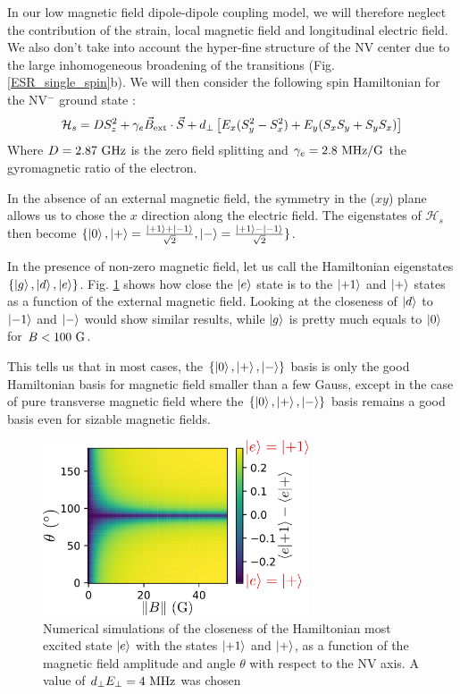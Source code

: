 \documentclass[preprintnumbers,amsmath,amssymb,onecolumn,12pt]{revtex4-2}
\begin{document}
In our low magnetic field dipole-dipole coupling model, we will therefore neglect the contribution of the strain, local magnetic field and longitudinal electric field.  We also don't take into account the hyper-fine structure of the NV center due to the large inhomogeneous broadening of the transitions (Fig. \ref{ESR_single_spin}b).
We will then consider the following spin Hamiltonian for the NV$^-$ ground state : 
\begin{equation}
\label{NV Hamiltonian}
\mathcal{H}_s=D S_z^2 + \gamma_e \vec{B}_{\rm ext} \cdot \vec{S}+ d_\perp \left[ E_x(S_y^2-S_x^2) + E_y(S_xS_y+S_yS_x) \right]
\end{equation}
Where $D=2.87\ \rm GHz$ is the zero field splitting and $\gamma_e=2.8\ \rm MHz/G$ the gyromagnetic ratio of the electron.

In the absence of an external magnetic field, the symmetry in the ($xy$) plane allows us to chose the $x$ direction along the electric field. The eigenstates of $\mathcal{H}_s$ then become $\{ \ket{0},\ket{+}=\frac{\ket{+1}+\ket{-1}}{\sqrt{2}},\ket{-}=\frac{\ket{+1}-\ket{-1}}{\sqrt{2}} \} $.

In the presence of non-zero magnetic field, let us call the Hamiltonian eigenstates $\{ \ket{g},\ket{d}, \ket{e} \} $. Fig. \ref{map etats propres} shows how close the $\ket{e}$ state is to the $\ket{+1}$ and $\ket{+}$ states as a function of the external magnetic field. Looking at the closeness of $\ket{d}$ to $\ket{-1}$ and $\ket{-}$ would show similar results, while $\ket{g}$ is pretty much equals to $\ket{0}$ for $B<100\ \rm G$.

This tells us that in most cases, the $\{ \ket{0},\ket{+},\ket{-} \}$ basis is only the good Hamiltonian basis for magnetic field smaller than a few Gauss, except in the case of pure transverse magnetic field where the $\{ \ket{0},\ket{+},\ket{-} \}$ basis remains a good basis even for sizable magnetic fields.
\begin{figure}
\includegraphics[width=0.7\textwidth]{Figures_SI/map_etats_propres}
\caption{Numerical simulations of the closeness of the Hamiltonian most excited state $\ket{e}$ with the states $\ket{+1}$ and $\ket{+}$, as a function of the magnetic field amplitude and angle $\theta$ with respect to the NV axis. A value of $d_\perp E_\perp = 4\ \rm MHz$ was chosen}
\label{map etats propres}
\end{figure}
\end{document}
